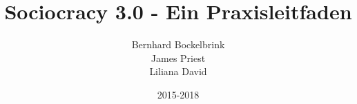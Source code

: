 \documentclass[a5paper]{scrreprt}
\begin{document}
	\title{Sociocracy 3.0 - Ein Praxisleitfaden}
	\author{Bernhard Bockelbrink\\James Priest\\Liliana David}
	\date{2015-2018}
	\maketitle
	
	\setcounter{tocdepth}{0}
	\tableofcontents
	\setcounter{tocdepth}{1}
	\listoffigures
    
    
\end{document}
